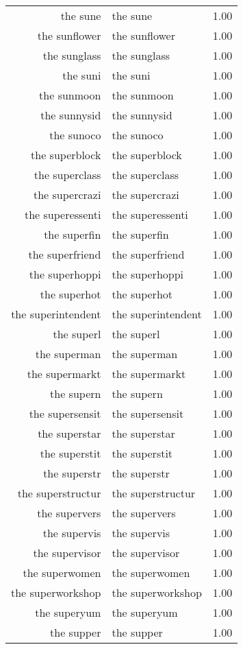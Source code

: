 \begin{table}[ht]
\begin{tabular}{rlr}
  the sune & the sune & 1.00 \\ 
  the sunflower & the sunflower & 1.00 \\ 
  the sunglass & the sunglass & 1.00 \\ 
  the suni & the suni & 1.00 \\ 
  the sunmoon & the sunmoon & 1.00 \\ 
  the sunnysid & the sunnysid & 1.00 \\ 
  the sunoco & the sunoco & 1.00 \\ 
  the superblock & the superblock & 1.00 \\ 
  the superclass & the superclass & 1.00 \\ 
  the supercrazi & the supercrazi & 1.00 \\ 
  the superessenti & the superessenti & 1.00 \\ 
  the superfin & the superfin & 1.00 \\ 
  the superfriend & the superfriend & 1.00 \\ 
  the superhoppi & the superhoppi & 1.00 \\ 
  the superhot & the superhot & 1.00 \\ 
  the superintendent & the superintendent & 1.00 \\ 
  the superl & the superl & 1.00 \\ 
  the superman & the superman & 1.00 \\ 
  the supermarkt & the supermarkt & 1.00 \\ 
  the supern & the supern & 1.00 \\ 
  the supersensit & the supersensit & 1.00 \\ 
  the superstar & the superstar & 1.00 \\ 
  the superstit & the superstit & 1.00 \\ 
  the superstr & the superstr & 1.00 \\ 
  the superstructur & the superstructur & 1.00 \\ 
  the supervers & the supervers & 1.00 \\ 
  the supervis & the supervis & 1.00 \\ 
  the supervisor & the supervisor & 1.00 \\ 
  the superwomen & the superwomen & 1.00 \\ 
  the superworkshop & the superworkshop & 1.00 \\ 
  the superyum & the superyum & 1.00 \\ 
  the supper & the supper & 1.00 \\ 

\end{tabular}
\end{table}
